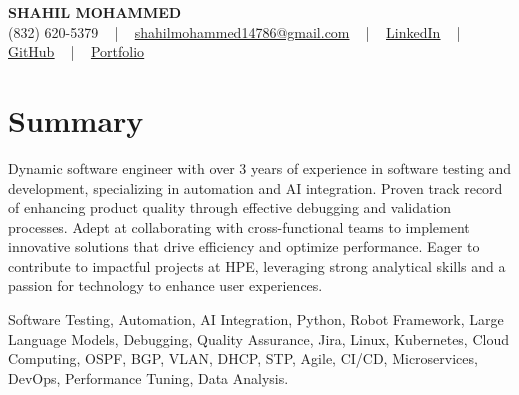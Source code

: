 \documentclass[letterpaper,10pt]{article}
\begin{document}
\begin{center}
    {\fontsize{14pt}{12pt}\selectfont \textbf{\MakeUppercase{Shahil Mohammed}}}\\ \vspace{2pt}
    \fontsize{10pt}{12pt}\selectfont (832) 620-5379 ~ | ~ \href{mailto:shahilmohammed14786@gmail.com}{shahilmohammed14786@gmail.com} ~ | ~  
    \href{https://www.linkedin.com/in/shahil-mohammed-9652931a1/}{\color{blue}\underline{LinkedIn}}  ~ | ~ 
    \href{https://github.com/freakbeast14}{\color{blue}\underline{GitHub}} ~ | ~ 
    \href{https://shahil-mohammed.netlify.app/}{\color{blue}\underline{Portfolio}}
    \vspace{-8pt}
\end{center}

\section{Summary}
\vspace{-2pt}\fontsize{8pt}{9pt}\selectfont
Dynamic software engineer with over 3 years of experience in software testing and development, specializing in automation and AI integration. Proven track record of enhancing product quality through effective debugging and validation processes. Adept at collaborating with cross-functional teams to implement innovative solutions that drive efficiency and optimize performance. Eager to contribute to impactful projects at HPE, leveraging strong analytical skills and a passion for technology to enhance user experiences.
 \vspace{-5pt}
 
{\fontsize{1pt}{1pt}\selectfont\color{white}
Software Testing, Automation, AI Integration, Python, Robot Framework, Large Language Models, Debugging, Quality Assurance, Jira, Linux, Kubernetes, Cloud Computing, OSPF, BGP, VLAN, DHCP, STP, Agile, CI/CD, Microservices, DevOps, Performance Tuning, Data Analysis.
}
\vspace{-8pt}

\vspace{-2pt}
\end{document}
